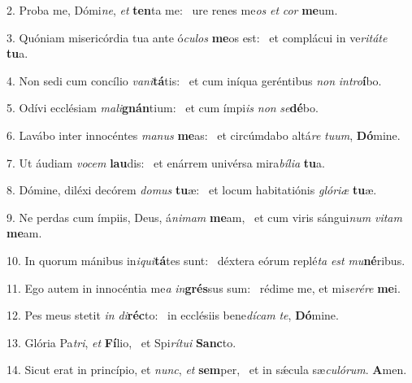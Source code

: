 2. Proba me, Dómi\textit{ne}, \textit{et} \textbf{ten}ta me: \ast\  ure renes me\textit{os} \textit{et} \textit{cor} \textbf{me}um.\

3. Quóniam misericórdia tua ante ó\textit{cu}\textit{los} \textbf{me}os est: \ast\  et complácui in ve\textit{ri}\textit{tá}\textit{te} \textbf{tu}a.\

4. Non sedi cum concílio \textit{va}\textit{ni}\textbf{tá}tis: \ast\  et cum iníqua geréntibus \textit{non} \textit{in}\textit{tro}\textbf{í}bo.\

5. Odívi ecclésiam \textit{ma}\textit{li}\textbf{gnán}tium: \ast\  et cum ímpi\textit{is} \textit{non} \textit{se}\textbf{dé}bo.\

6. Lavábo inter innocéntes \textit{ma}\textit{nus} \textbf{me}as: \ast\  et circúmdabo altá\textit{re} \textit{tu}\textit{um}, \textbf{Dó}mine.\

7. Ut áudiam \textit{vo}\textit{cem} \textbf{lau}dis: \ast\  et enárrem univérsa mira\textit{bí}\textit{li}\textit{a} \textbf{tu}a.\

8. Dómine, diléxi decórem \textit{do}\textit{mus} \textbf{tu}æ: \ast\  et locum habitatiónis \textit{gló}\textit{ri}\textit{æ} \textbf{tu}æ.\

9. Ne perdas cum ímpiis, Deus, á\textit{ni}\textit{mam} \textbf{me}am, \ast\  et cum viris sángui\textit{num} \textit{vi}\textit{tam} \textbf{me}am.\

10. In quorum mánibus in\textit{i}\textit{qui}\textbf{tá}tes sunt: \ast\  déxtera eórum replé\textit{ta} \textit{est} \textit{mu}\textbf{né}ribus.\

11. Ego autem in innocéntia me\textit{a} \textit{in}\textbf{grés}sus sum: \ast\  rédime me, et mi\textit{se}\textit{ré}\textit{re} \textbf{me}i.\

12. Pes meus stetit \textit{in} \textit{di}\textbf{réc}to: \ast\  in ecclésiis bene\textit{dí}\textit{cam} \textit{te}, \textbf{Dó}mine.\

13. Glória Pa\textit{tri}, \textit{et} \textbf{Fí}lio, \ast\  et Spi\textit{rí}\textit{tu}\textit{i} \textbf{Sanc}to.\

14. Sicut erat in princípio, et \textit{nunc}, \textit{et} \textbf{sem}per, \ast\  et in sǽcula sæ\textit{cu}\textit{ló}\textit{rum}. \textbf{A}men.\

